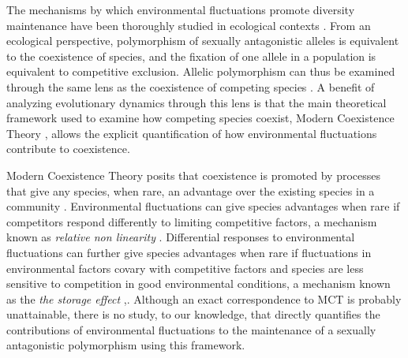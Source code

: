 \documentclass[12pt]{article}
\begin{document}
The mechanisms by which environmental fluctuations promote diversity maintenance have been thoroughly studied in ecological contexts \citep{levins1979coexistence,armstrong1980competitive,chesson2000general,barabas_chessons_2018}. From an ecological perspective, polymorphism of sexually antagonistic alleles is equivalent to the coexistence of species, and the fixation of one allele in a population is equivalent to competitive exclusion. Allelic polymorphism can thus be examined through the same lens as the coexistence of competing species \citep{ellner1994role,ellner1996patterns,dean2005protecting,schreiber2010interactive}. A benefit of analyzing evolutionary dynamics through this lens is that the main theoretical framework used to examine how competing species coexist, Modern Coexistence Theory \citep{Chesson2000, barabas_chessons_2018}, allows the explicit quantification of how environmental fluctuations contribute to coexistence.

Modern Coexistence Theory posits that coexistence is promoted by processes that give any species, when rare, an advantage over the existing species in a community \citep{chesson1994multispecies,Chesson2000}. Environmental fluctuations can give species advantages when rare if competitors respond differently to limiting competitive factors, a mechanism known as \textit{relative non linearity} \citep{chesson2000general,ellner2016quantify,zepeda2019fluctuation}. Differential responses to environmental fluctuations can further give species advantages when rare if fluctuations in environmental factors covary with competitive factors and species are less sensitive to competition in good environmental conditions, a mechanism known as the \textit{the storage effect} \citep{Chesson2000,ellner2016quantify,barabas_chessons_2018,schreiber2021positively},. Although an exact correspondence to MCT is probably unattainable, there is no study, to our knowledge, that directly quantifies the contributions of environmental fluctuations to the maintenance of a sexually antagonistic polymorphism using this framework.

\end{document}

